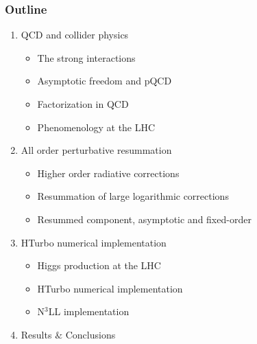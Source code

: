 \documentclass[aspectratio=43]{beamer}
\begin{document}
\begin{frame}

	\frametitle{Outline}
	
	\begin{enumerate}
		\item {\color{blue}QCD and collider physics}
		\begin{itemize}
			\item The strong interactions
			\item Asymptotic freedom and pQCD
			\item Factorization in QCD
			\item Phenomenology at the LHC
		\end{itemize}
		\item {\color{blue}All order perturbative resummation}
		\begin{itemize}
			\item Higher order radiative corrections
			\item Resummation of large logarithmic corrections
			\item Resummed component, asymptotic and fixed-order
		\end{itemize}
		\item {\color{blue}HTurbo numerical implementation}
		\begin{itemize}
			\item Higgs production at the LHC
			\item HTurbo numerical implementation
			\item N$^{3}$LL implementation
		\end{itemize}
		\item {\color{blue}Results $\&$ Conclusions}
	\end{enumerate}
	
\end{frame}

%
%

\begin{frame}


\end{frame}
\end{document}
